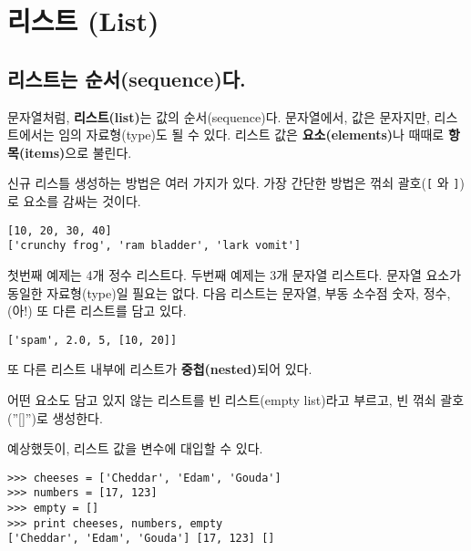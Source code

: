 
\chapter{리스트 (List)}


\section{리스트는 순서(sequence)다.}

문자열처럼, {\bf 리스트(list)}는 값의 순서(sequence)다. 
문자열에서, 값은 문자지만, 리스트에서는 임의 자료형(type)도 될 수 있다.
리스트 값은 {\bf 요소(elements)}나 때때로 {\bf 항목(items)}으로 불린다.


신규 리스틀 생성하는 방법은 여러 가지가 있다. 
가장 간단한 방법은 꺾쇠 괄호(\verb"[" 와 \verb"]")로 요소를 감싸는 것이다.

\beforeverb
\begin{verbatim}
[10, 20, 30, 40]
['crunchy frog', 'ram bladder', 'lark vomit']
\end{verbatim}
\afterverb
%

첫번째 예제는 4개 정수 리스트다. 
두번째 예제는 3개 문자열 리스트다.
문자열 요소가 동일한 자료형(type)일 필요는 없다. 
다음 리스트는 문자열, 부동 소수점 숫자, 정수, (아!) 또 다른 리스트를 담고 있다.

\beforeverb
\begin{verbatim}
['spam', 2.0, 5, [10, 20]]
\end{verbatim}
\afterverb
%

또 다른 리스트 내부에 리스트가 {\bf 중첩(nested)}되어 있다.


어떤 요소도 담고 있지 않는 리스트를 빈 리스트(empty list)라고 부르고, 빈 꺾쇠 괄호(''[]'')로 생성한다.


예상했듯이, 리스트 값을 변수에 대입할 수 있다.

\beforeverb
\begin{verbatim}
>>> cheeses = ['Cheddar', 'Edam', 'Gouda']
>>> numbers = [17, 123]
>>> empty = []
>>> print cheeses, numbers, empty
['Cheddar', 'Edam', 'Gouda'] [17, 123] []
\end{verbatim}
\afterverb
%

